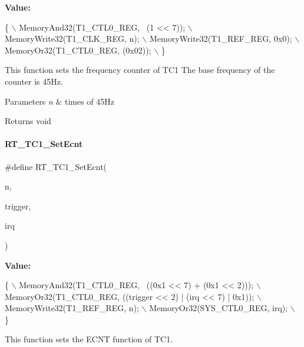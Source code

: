 {\bfseries Value\+:}
\begin{DoxyCode}
\{                                        \(\backslash\)
        MemoryAnd32(T1\_CTL0\_REG, ~(1 << 7)); \(\backslash\)
        MemoryWrite32(T1\_CLK\_REG, n);        \(\backslash\)
        MemoryWrite32(T1\_REF\_REG, 0x0);      \(\backslash\)
        MemoryOr32(T1\_CTL0\_REG, (0x02));     \(\backslash\)
    \}
\end{DoxyCode}


This function sets the frequency counter of T\+C1 The base frequency of the counter is 45\+Hz. 


\begin{DoxyParams}{Parameters}
{\em n} & times of 45\+Hz \\
\hline
\end{DoxyParams}
\begin{DoxyReturn}{Returns}
void 
\end{DoxyReturn}
\mbox{\label{a00044_a4b786bd70b41c950892beeef4cbd2b27}} 
\paragraph{\texorpdfstring{R\+T\+\_\+\+T\+C1\+\_\+\+Set\+Ecnt}{RT\_TC1\_SetEcnt}}
{\footnotesize\ttfamily \#define R\+T\+\_\+\+T\+C1\+\_\+\+Set\+Ecnt(\begin{DoxyParamCaption}\item[{}]{n,  }\item[{}]{trigger,  }\item[{}]{irq }\end{DoxyParamCaption})}

{\bfseries Value\+:}
\begin{DoxyCode}
\{                                                                 \(\backslash\)
        MemoryAnd32(T1\_CTL0\_REG, ~((0x1 << 7) + (0x1 << 2)));         \(\backslash\)
        MemoryOr32(T1\_CTL0\_REG, ((trigger << 2) | (irq << 7) | 0x1)); \(\backslash\)
        MemoryWrite32(T1\_REF\_REG, n);                                 \(\backslash\)
        MemoryOr32(SYS\_CTL0\_REG, irq);                                \(\backslash\)
    \}
\end{DoxyCode}


This function sets the E\+C\+NT function of T\+C1. 


